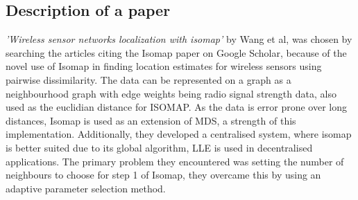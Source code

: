\documentclass{article}
\begin{document}
\subsection{Description of a paper}
\textit {'Wireless sensor networks localization with isomap'} by Wang et al,\cite{wang2009wireless} was chosen by searching the articles citing the Isomap paper on Google Scholar, because of the novel use of Isomap in finding location estimates for wireless sensors using pairwise dissimilarity. The data can be represented on a graph as a neighbourhood graph with edge weights being radio signal strength data, also used as the euclidian distance for ISOMAP. As the data is error prone over long distances, Isomap is used as an extension of MDS, a strength of this implementation. Additionally, they developed a centralised system, where isomap is better suited due to its global algorithm, LLE is used in decentralised applications.\cite{patwari2004manifold} The primary problem they encountered was setting the number of neighbours to choose for step 1 of Isomap, they overcame this by using an adaptive parameter selection method.
{}

\end{document}
